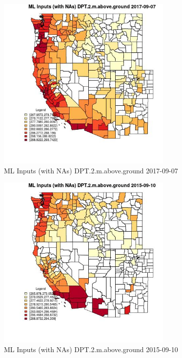\begin{figure} 
\centering  
\includegraphics[width=0.77\textwidth]{Code_Outputs/Report_ML_input_PM25_Step4_part_e_de_duplicated_aves_compiled_2019-05-21wNAs_CountyDPT2mabovegroundMean2017-09-07.jpg} 
\caption{\label{fig:Report_ML_input_PM25_Step4_part_e_de_duplicated_aves_compiled_2019-05-21wNAsCountyDPT2mabovegroundMean2017-09-07}ML Inputs (with NAs) DPT.2.m.above.ground 2017-09-07} 
\end{figure} 
 

\begin{figure} 
\centering  
\includegraphics[width=0.77\textwidth]{Code_Outputs/Report_ML_input_PM25_Step4_part_e_de_duplicated_aves_compiled_2019-05-21wNAs_CountyDPT2mabovegroundMean2015-09-10.jpg} 
\caption{\label{fig:Report_ML_input_PM25_Step4_part_e_de_duplicated_aves_compiled_2019-05-21wNAsCountyDPT2mabovegroundMean2015-09-10}ML Inputs (with NAs) DPT.2.m.above.ground 2015-09-10} 
\end{figure} 
 


